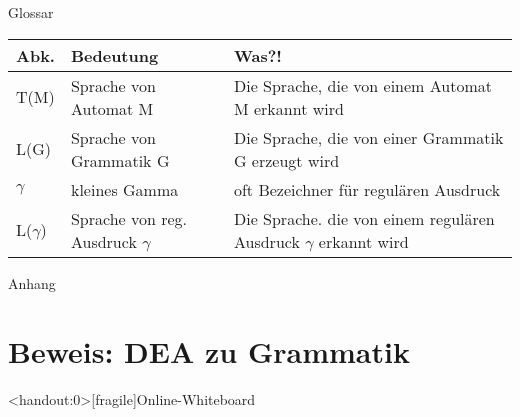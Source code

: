 \begin{frame}[fragile]{Glossar}
    \small
    \begin{tabular}{p{} p{} p{}}
        \toprule
        Abk.        & Bedeutung                          & Was?!                                                               \\
        \midrule
        T(M)        & Sprache von Automat M              & Die Sprache, die von einem Automat M erkannt wird                   \\
        L(G)        & Sprache von Grammatik G            & Die Sprache, die von einer Grammatik G erzeugt wird                 \\
        $\gamma$    & kleines Gamma                      & oft Bezeichner für regulären Ausdruck                               \\
        L($\gamma$) & Sprache von reg. Ausdruck $\gamma$ & Die Sprache. die von einem regulären Ausdruck $\gamma$ erkannt wird \\
        \bottomrule
    \end{tabular}
\end{frame}

\appendix
\begin{frame}[standout]
    Anhang
\end{frame}

\section{Beweis: DEA zu Grammatik}


\begin{frame}<handout:0>[fragile]{Online-Whiteboard}
    \phantom{text}
\end{frame}


